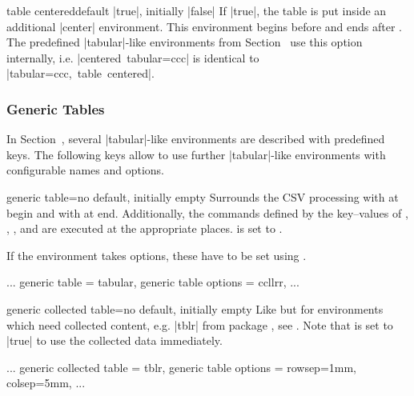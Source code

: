 \documentclass[a4paper,11pt]{ltxdoc}
\begin{document}
\begin{docCsvKey}[][doc new=2021-09-09]{table centered}{}{default |true|, initially |false|}
  If |true|, the table is put inside an additional |center| environment.
  This environment begins before 
  and ends after . The predefined |tabular|-like environments
  from Section~ use this option internally,
  i.e. \mbox{|centered tabular={ccc}|} is identical to
  \mbox{|tabular={ccc}, table centered|}.
\end{docCsvKey}


\clearpage
\subsubsection{Generic Tables}\label{subsubsec:table_generic}
In Section~, several |tabular|-like environments
are described with predefined keys. The following keys allow to use further
|tabular|-like environments with configurable names and options.


\begin{docCsvKey}[][doc new=2021-09-09]{generic table}{=}{no default, initially empty}
  Surrounds the CSV processing with 
  at begin and with  at end.
  Additionally, the commands defined by the key–values of
  , , ,
  and  are executed at the appropriate places.
   is set to \cs{}\cs{}.\par
  If the environment  takes options, these have to be set using
  .

\begin{dispListing}
  ...
  generic table         = tabular,
  generic table options = {{ccllrr}},
  ...
\end{dispListing}
\end{docCsvKey}


\begin{docCsvKey}[][doc new and updated={2021-09-09}{2023-12-18}]{generic collected table}{=}{no default, initially empty}
  Like  but for environments which need
  collected content, e.g. |tblr| from package , see .
  Note that  is set to |true| to
  use the collected data immediately.

\begin{dispListing}
  ...
  generic collected table = tblr,
  generic table options   = {{rowsep=1mm, colsep=5mm}},
  ...
\end{dispListing}
\end{docCsvKey}
\end{document}
